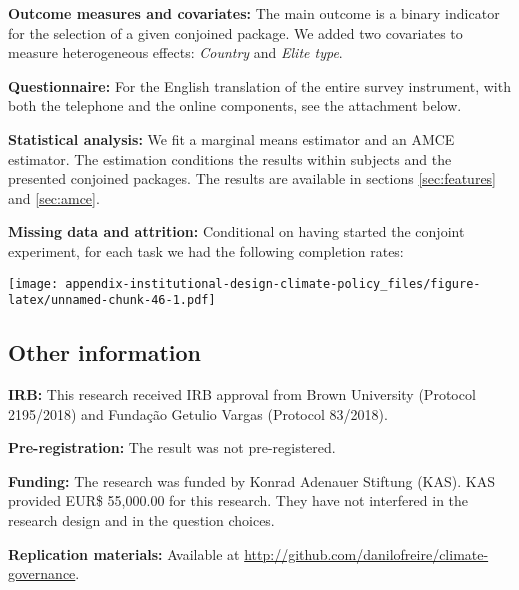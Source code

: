 \documentclass[12pt,a4paper,]{article}
\newenvironment{Shaded}{\begin{snugshade}}{\end{snugshade}}
\newcommand{\DataTypeTok}[1]{\textcolor[rgb]{0.13,0.29,0.53}{#1}}
\newcommand{\DecValTok}[1]{\textcolor[rgb]{0.00,0.00,0.81}{#1}}
\newcommand{\KeywordTok}[1]{\textcolor[rgb]{0.13,0.29,0.53}{\textbf{#1}}}
\newcommand{\NormalTok}[1]{#1}
\newcommand{\OperatorTok}[1]{\textcolor[rgb]{0.81,0.36,0.00}{\textbf{#1}}}
\newcommand{\StringTok}[1]{\textcolor[rgb]{0.31,0.60,0.02}{#1}}
\begin{document}
\noindent \textbf{Outcome measures and covariates:} The main outcome is
a binary indicator for the selection of a given conjoined package. We
added two covariates to measure heterogeneous effects: \emph{Country}
and \emph{Elite type}.

\noindent \textbf{Questionnaire:} For the English translation of the
entire survey instrument, with both the telephone and the online
components, see the attachment below.

\noindent \textbf{Statistical analysis:} We fit a marginal means
estimator and an AMCE estimator. The estimation conditions the results
within subjects and the presented conjoined packages. The results are
available in sections \ref{sec:features} and \ref{sec:amce}.

\noindent \textbf{Missing data and attrition:} Conditional on having
started the conjoint experiment, for each task we had the following
completion rates:

\begin{Shaded}
\end{Shaded}

\texttt{[image: appendix-institutional-design-climate-policy\_files/figure-latex/unnamed-chunk-46-1.pdf]}

\hypertarget{other-information}{%
\subsection{Other information}\label{other-information}}

\noindent \textbf{IRB:} This research received IRB approval from Brown
University (Protocol 2195/2018) and Fundação Getulio Vargas (Protocol
83/2018).

\noindent \textbf{Pre-registration:} The result was not pre-registered.

\noindent \textbf{Funding:} The research was funded by Konrad Adenauer
Stiftung (KAS). KAS provided EUR\$ 55,000.00 for this research. They
have not interfered in the research design and in the question choices.

\noindent \textbf{Replication materials:} Available at
\url{http://github.com/danilofreire/climate-governance}.

\renewcommand\refname{Bibliography}

\end{document}
